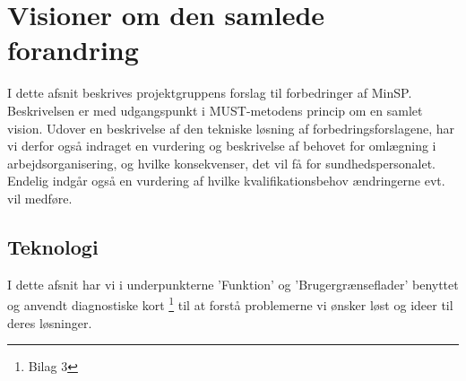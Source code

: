 %
%
%
%
%
%
%
%
%
%
%
%
%
%
%
%
%
%
%
%
%
%
%
%
%
%
%
\section{Visioner om den samlede forandring}
I dette afsnit beskrives projektgruppens forslag til forbedringer af MinSP. Beskrivelsen er med udgangspunkt i MUST-metodens princip om en samlet vision.
Udover en beskrivelse af den tekniske løsning af forbedringsforslagene, har vi derfor også indraget en vurdering og beskrivelse af behovet for omlægning i arbejdsorganisering, og hvilke konsekvenser, det vil få for sundhedspersonalet. \\
Endelig indgår også en vurdering af hvilke kvalifikationsbehov ændringerne evt. vil medføre.%
\subsection{Teknologi}
I dette afsnit har vi i underpunkterne 'Funktion' og 'Brugergrænseflader' benyttet og anvendt diagnostiske kort \footnote{Bilag 3} til at forstå problemerne vi ønsker løst og ideer til deres løsninger.
%
%
